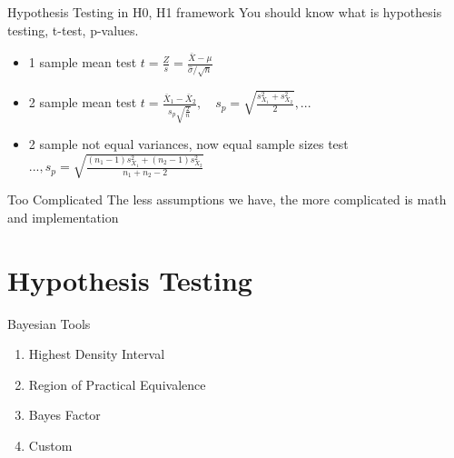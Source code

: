 \documentclass{beamer}
\begin{document}
\begin{frame}{Hypothesis Testing in H0, H1 framework}
    You should know what is hypothesis testing, t-test, p-values.
    \begin{itemize}
        \item 1 sample mean test ${\displaystyle t={\frac {Z}{s}}={\frac {{\bar {X}}-\mu }{{\widehat {\sigma }}/{\sqrt {n}}}}}$
        \item 2 sample mean test ${\displaystyle t={\frac {{\bar {X}}_{1}-{\bar {X}}_{2}}{s_{p}{\sqrt {\frac {2}{n}}}}}},\quad{\displaystyle s_{p}={\sqrt {\frac {s_{X_{1}}^{2}+s_{X_{2}}^{2}}{2}}}}, ...$
        \item 2 sample not equal variances, now equal sample sizes test $...,{\displaystyle s_{p}={\sqrt {\frac {\left(n_{1}-1\right)s_{X_{1}}^{2}+\left(n_{2}-1\right)s_{X_{2}}^{2}}{n_{1}+n_{2}-2}}}}$
    \end{itemize}
    \begin{block}{Too Complicated}
    The less assumptions we have, the more complicated is math and implementation
    \end{block}
\end{frame}
\section{Hypothesis Testing}
\begin{frame}{Bayesian Tools}
    \begin{enumerate}
        \item Highest Density Interval
        \item Region of Practical Equivalence
        \item Bayes Factor
        \item Custom
    \end{enumerate}
\end{frame}
\end{document}
